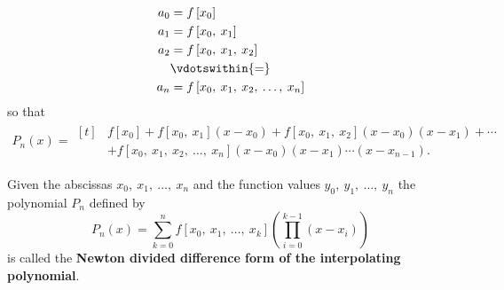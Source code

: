 \documentclass{article}
\begin{document}
\begin{align*}
    a_0 & = f\left[ x_0 \right]                               \\
    a_1 & = f\left[ x_0,\: x_1 \right]                        \\
    a_2 & = f\left[ x_0,\: x_1,\: x_2 \right]                 \\
        & \vdotswithin{=}                                     \\
    a_n & = f\left[ x_0,\: x_1,\: x_2,\: \dots,\: x_n \right]
\end{align*}
so that
\begin{align*}
    P_n\left( x \right) =
    \begin{aligned}[t]
         & f\left[ x_0 \right] + f\left[ x_0,\: x_1 \right] \left( x - x_0 \right) + f\left[ x_0,\: x_1,\: x_2 \right] \left( x - x_0 \right) \left( x - x_1 \right) + \cdots \\
         & + f\left[ x_0,\: x_1,\: x_2,\: \dots,\: x_n \right] \left( x - x_0 \right) \left( x - x_1 \right) \cdots \left( x - x_{n - 1} \right).
    \end{aligned}
\end{align*}
\begin{definition}
    Given the abscissas \(x_0,\: x_1,\: \dots,\: x_n\) and the function
    values \(y_0,\: y_1,\: \dots,\: y_n\) the polynomial \(P_n\) defined
    by
    \begin{equation*}
        P_n\left( x \right) = \sum_{k = 0}^n f\left[ x_0,\: x_1,\: \dots,\: x_k \right] \left( \prod_{i = 0}^{k - 1} \left( x - x_i \right) \right)
    \end{equation*}
    is called the \textbf{Newton divided difference form of the
        interpolating polynomial}.
\end{definition}
\end{document}
